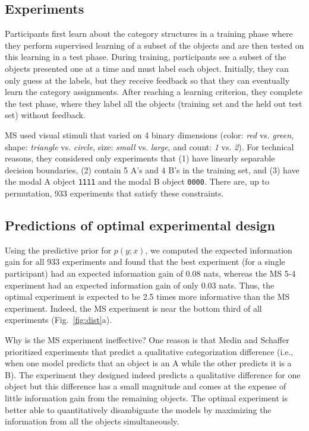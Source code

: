 \documentclass{article}
\begin{document}
\subsection{Experiments}

Participants first learn about the category structures in a training phase where they perform supervised learning of a subset of the objects and are then tested on this learning in a test phase.
During training, participants see a subset of the objects presented one at a time and must label each object.
Initially, they can only guess at the labels, but they receive feedback so that they can eventually learn the category assignments.
After reaching a learning criterion, they complete the test phase, where they label all the objects (training set and the held out test set) without feedback.

MS used visual stimuli that varied on 4 binary dimensions (color: \emph{red} vs. \emph{green}, shape: \emph{triangle} vs. \emph{circle}, size: \emph{small} vs. \emph{large}, and count: \emph{1} vs. \emph{2}).
For technical reasons, they considered only experiments that (1) have linearly separable decision boundaries, (2) contain 5 A's and 4 B's in the training set, and (3) have the modal A object \lstinline{1111} and the modal B object \lstinline{0000}.
There are, up to permutation, 933 experiments that satisfy these constraints.

\subsection{Predictions of optimal experimental design}

Using the predictive prior for $p(y; x)$, we computed the expected information gain for all 933 experiments and found that the best experiment (for a single participant) had an expected information gain of 0.08 nats, whereas the MS 5-4 experiment had an expected information gain of only 0.03 nats.
Thus, the optimal experiment is expected to be 2.5 times more informative than the MS experiment.
Indeed, the MS experiment is near the bottom third of all experiments (Fig.~\ref{fig:dist}a).

Why is the MS experiment ineffective?
One reason is that Medin and Schaffer prioritized experiments that predict a qualitative categorization difference (i.e., when one model predicts that an object is an A while the other predicts it is a B).
The experiment they designed indeed predicts a qualitative difference for one object but this difference has a small magnitude and comes at the expense of little information gain from the remaining objects.
The optimal experiment is better able to quantitatively disambiguate the models by maximizing the information from all the objects simultaneously.
\end{document}
